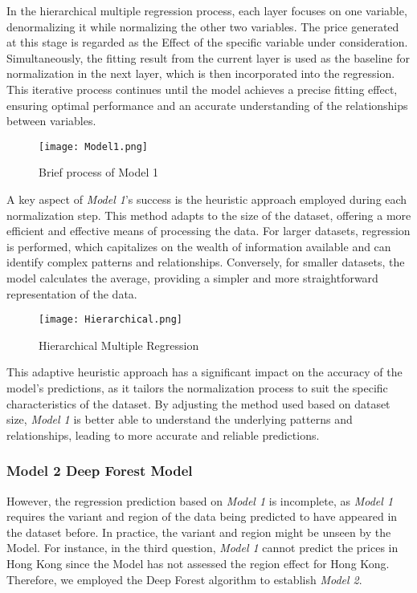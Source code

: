 \documentclass[12pt]{article}  %
\begin{document}
In the hierarchical multiple regression process, each layer focuses on one variable, denormalizing it while normalizing the other two variables. The price generated at this stage is regarded as the Effect of the specific variable under consideration. Simultaneously, the fitting result from the current layer is used as the baseline for normalization in the next layer, which is then incorporated into the regression. This iterative process continues until the model achieves a precise fitting effect, ensuring optimal performance and an accurate understanding of the relationships between variables.
\begin{figure}[htbp]
    \centering
    \texttt{[image: Model1.png]}
    \caption{Brief process of Model 1}\label{fig:Model1}
\end{figure}
A key aspect of \emph{Model 1}'s success is the heuristic approach employed during each normalization step. This method adapts to the size of the dataset, offering a more efficient and effective means of processing the data. For larger datasets, regression is performed, which capitalizes on the wealth of information available and can identify complex patterns and relationships. Conversely, for smaller datasets, the model calculates the average, providing a simpler and more straightforward representation of the data.

\begin{figure}[htbp]
    \centering
    \texttt{[image: Hierarchical.png]}
    \caption{Hierarchical Multiple Regression}\label{fig:Hierarchical}
\end{figure}

This adaptive heuristic approach has a significant impact on the accuracy of the model's predictions, as it tailors the normalization process to suit the specific characteristics of the dataset. By adjusting the method used based on dataset size, \emph{Model 1} is better able to understand the underlying patterns and relationships, leading to more accurate and reliable predictions.


\subsubsection{Model 2 \textemdash  Deep Forest Model}


However, the regression prediction based on \emph{Model 1} is incomplete, as \emph{Model 1} requires the variant and region of the data being predicted to have appeared in the dataset before. In practice, the variant and region might be unseen by the Model. For instance, in the third question, \emph{Model 1} cannot predict the prices in Hong Kong since the Model has not assessed the region effect for Hong Kong. Therefore, we employed the Deep Forest algorithm to establish \emph{Model 2}.
\end{document}
